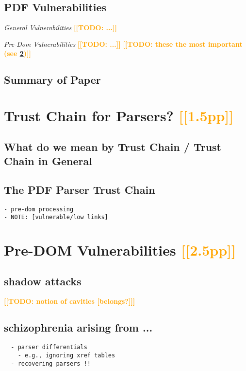 \documentclass[conference,11pt]{IEEEtran}
\newcommand{\note}[1]{\noteYes{#1}}
\newcommand{\noteYes}[1]{\textbf{\textcolor{orange}{[[#1]]}}}
\newcommand{\todo}[1]{\note{TODO: #1}}
\begin{document}
\subsection{PDF Vulnerabilities}

\emph{General Vulnerabilities} \todo{...}

\emph{Pre-Dom Vulnerabilities} \todo{...}
\todo{these the most important (see \cref{sec:predom-vulnerabilities})}


\subsection{Summary of Paper}
      
\section{Trust Chain for Parsers? \note{1.5pp}}
\label{sec:trustchain}

\subsection{What do we mean by Trust Chain / Trust Chain in General}

\subsection{The PDF Parser Trust Chain}

\begin{lstlisting}
- pre-dom processing
- NOTE: [vulnerable/low links]
\end{lstlisting}

\section{Pre-DOM Vulnerabilities \note{2.5pp}}
\label{sec:predom-vulnerabilities}

\subsection{shadow attacks}
\todo{notion of cavities [belongs?]}

\subsection{schizophrenia arising from ...}
\begin{lstlisting}
  - parser differentials
    - e.g., ignoring xref tables
  - recovering parsers !!
\end{lstlisting}
\end{document}
